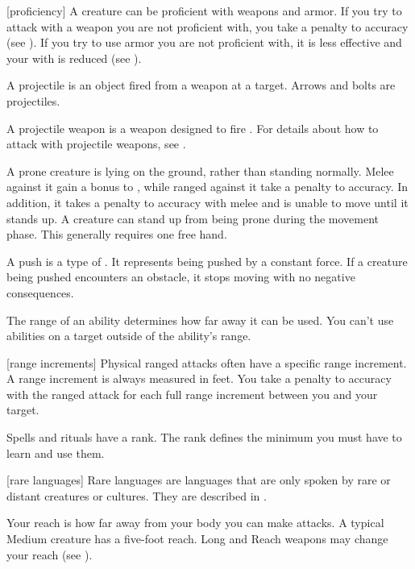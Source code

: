 [proficiency] A creature can be proficient with weapons and armor.
If you try to attack with a weapon you are not proficient with, you take a  penalty to accuracy (see ).
If you try to use armor you are not proficient with, it is less effective and your  with  is reduced (see ).

 A projectile is an object fired from a weapon at a target.
Arrows and bolts are projectiles.

 A projectile weapon is a weapon designed to fire .
For details about how to attack with projectile weapons, see .

 A prone creature is lying on the ground, rather than standing normally.
Melee  against it gain a  bonus to , while ranged  against it take a  penalty to accuracy.
In addition, it takes a  penalty to accuracy with melee  and is unable to move until it stands up.
A creature can stand up from being prone during the movement phase.
This generally requires one free hand.

 A push is a type of .
It represents being pushed by a constant force.
If a creature being pushed encounters an obstacle, it stops moving with no negative consequences.

 The range of an ability determines how far away it can be used.
You can't use abilities on a target outside of the ability's range.

[range increments] Physical ranged attacks often have a specific range increment.
A range increment is always measured in feet.
You take a  penalty to accuracy with the ranged attack for each full range increment between you and your target.

 Spells and rituals have a rank.
The rank defines the minimum  you must have to learn and use them.

[rare languages] Rare languages are languages that are only spoken by rare or distant creatures or cultures.
They are described in .

 Your reach is how far away from your body you can make  attacks.
A typical Medium creature has a five-foot reach.
Long and Reach weapons may change your reach (see ).

